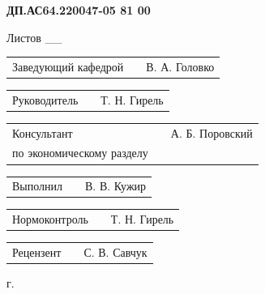 \documentclass[a4paper]{article}
\begin{document}
\vspace{32pt}

\begin{Center}{
\cyrillicfontsf 
\englishfontsf
\bfseries
\fontsize{16pt}{0pt}\selectfont 
    ДП.АС64.220047-05 81 00
}\end{Center}

\vspace{22pt}

\begin{Center}{
\cyrillicfontsf 
\englishfontsf
\fontsize{16pt}{0pt}\selectfont 
    Листов \_\_
}\end{Center}

\vspace{22pt}

\begin{FlushLeft} {
\cyrillicfontsf 
\englishfontsf
\fontsize{14pt}{0pt}\selectfont 

  \begin{tabular}{p{6.5cm} p{4.767cm} p{5.633cm}}
    \raggedleft Заведующий кафедрой & & В. А. Головко  
  \end{tabular}

  \vspace{14pt}
  
  \begin{tabular}{p{6.5cm} p{4.767cm} p{5.633cm}}
    \raggedleft Руководитель & & Т. Н. Гирель \\ 
  \end{tabular}

  \vspace{14pt}

  \begin{tabular}{p{6.5cm} p{4.767cm} p{5.633cm}}
    \raggedleft Консультант & & А. Б. Поровский \\
    \raggedleft по экономическому разделу & &
  \end{tabular}

  \vspace{14pt}

  \begin{tabular}{p{6.5cm} p{4.767cm} p{5.633cm}}
    \raggedleft Выполнил & & В. В. Кужир \\
  \end{tabular}

  \vspace{14pt}

  \begin{tabular}{p{6.5cm} p{4.767cm} p{5.633cm}}
    \raggedleft Нормоконтроль & & Т. Н. Гирель \\
  \end{tabular}

  \vspace{14pt}

  \begin{tabular}{p{6.5cm} p{4.767cm} p{5.633cm}}
    \raggedleft Рецензент & & С. В. Савчук \\
  \end{tabular}
  
  \vspace{14pt}
  
  \vspace{14pt}
  
}\end{FlushLeft}

\begin{Center}{
\cyrillicfontsf 
\englishfontsf
\fontsize{14pt}{21pt} г.
}\end{Center}
\end{document}
